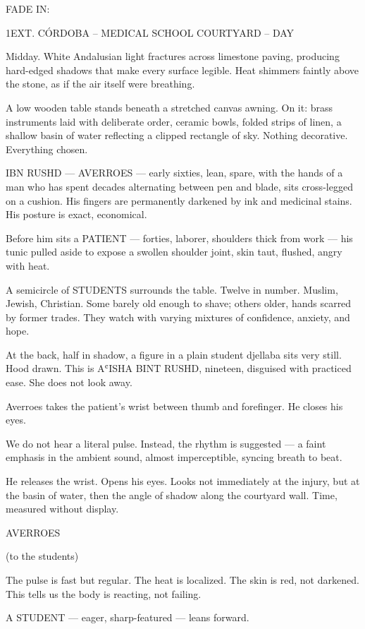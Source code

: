 \documentclass[12pt]{article}
\newlength{\charindent}
\newlength{\dialogueindent}
\newlength{\dialoguewidth}
\newlength{\parentheticalindent}
\newcommand{\slug}[1]{%
  \needspace{4\baselineskip}%
  \vspace{1.5em}%
  \noindent\MakeUppercase{#1}%
  \nopagebreak[4]%
  \par\vspace{0.75em}%
}
\newcommand{\action}[1]{%
  \noindent#1\par\vspace{0.75em}%
}
\newcommand{\character}[1]{%
  \needspace{3\baselineskip}%
  \par\vspace{0.5em}%
  \noindent\hspace*{\charindent}\MakeUppercase{#1}\nopagebreak[4]%
}
\newcommand{\parenthetical}[1]{%
  \par\nobreak\nopagebreak[4]%
  \noindent\hspace*{\parentheticalindent}(#1)%
}
\newcommand{\dialogue}[1]{%
  \par\nobreak\nopagebreak[4]%
  \noindent\hspace*{\dialogueindent}%
  \begin{minipage}[t]{\dialoguewidth}
  #1
  \end{minipage}%
  \par\vspace{0.5em}%
}
\begin{document}
\slug{FADE IN:}

\slug{1\quad EXT. CÓRDOBA -- MEDICAL SCHOOL COURTYARD -- DAY}

\action{Midday. White Andalusian light fractures across limestone paving, producing hard-edged shadows that make every surface legible. Heat shimmers faintly above the stone, as if the air itself were breathing.}

\action{A low wooden table stands beneath a stretched canvas awning. On it: brass instruments laid with deliberate order, ceramic bowls, folded strips of linen, a shallow basin of water reflecting a clipped rectangle of sky. Nothing decorative. Everything chosen.}

\action{IBN RUSHD — AVERROES — early sixties, lean, spare, with the hands of a man who has spent decades alternating between pen and blade, sits cross-legged on a cushion. His fingers are permanently darkened by ink and medicinal stains. His posture is exact, economical.}

\action{Before him sits a PATIENT — forties, laborer, shoulders thick from work — his tunic pulled aside to expose a swollen shoulder joint, skin taut, flushed, angry with heat.}

\action{A semicircle of STUDENTS surrounds the table. Twelve in number. Muslim, Jewish, Christian. Some barely old enough to shave; others older, hands scarred by former trades. They watch with varying mixtures of confidence, anxiety, and hope.}

\action{At the back, half in shadow, a figure in a plain student djellaba sits very still. Hood drawn. This is AʿISHA BINT RUSHD, nineteen, disguised with practiced ease. She does not look away.}

\action{Averroes takes the patient’s wrist between thumb and forefinger. He closes his eyes.}

\action{We do not hear a literal pulse. Instead, the rhythm is suggested — a faint emphasis in the ambient sound, almost imperceptible, syncing breath to beat.}

\action{He releases the wrist. Opens his eyes. Looks not immediately at the injury, but at the basin of water, then the angle of shadow along the courtyard wall. Time, measured without display.}

\character{AVERROES}
\parenthetical{to the students}
\dialogue{The pulse is fast but regular. The heat is localized. The skin is red, not darkened. This tells us the body is reacting, not failing.}

\action{A STUDENT — eager, sharp-featured — leans forward.}
\end{document}
